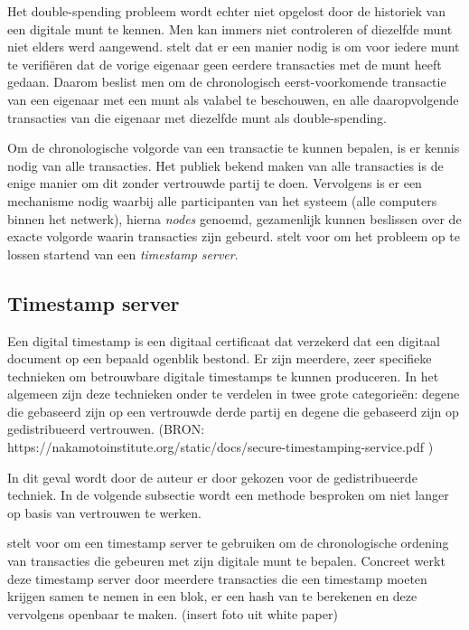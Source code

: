 	Het double-spending probleem wordt echter niet opgelost door de historiek van een digitale munt te kennen. Men kan immers niet controleren of diezelfde munt niet elders werd aangewend. \textcite{Nakamoto2008} stelt dat er een manier nodig is om voor iedere munt te verifiëren dat de vorige eigenaar geen eerdere transacties met de munt heeft gedaan. Daarom beslist men om de chronologisch eerst-voorkomende transactie van een eigenaar met een munt als valabel te beschouwen, en alle daaropvolgende transacties van die eigenaar met diezelfde munt als double-spending. 
			
	Om de chronologische volgorde van een transactie te kunnen bepalen, is er kennis nodig van alle transacties. Het publiek bekend maken van alle transacties is de enige manier om dit zonder vertrouwde partij te doen. Vervolgens is er een mechanisme nodig waarbij alle participanten van het systeem (alle computers binnen het netwerk), hierna \textit{nodes} genoemd, gezamenlijk kunnen beslissen over de exacte volgorde waarin transacties zijn gebeurd. \textcite{Nakamoto2008} stelt voor om het probleem op te lossen startend van een \textit{timestamp server}. 
			
	\subsection{Timestamp server}
	Een digital timestamp is een digitaal certificaat dat verzekerd dat een digitaal document op een bepaald ogenblik bestond. Er zijn meerdere, zeer specifieke technieken om betrouwbare digitale timestamps te kunnen produceren. In het algemeen zijn deze technieken onder te verdelen in twee grote categorieën: degene die gebaseerd zijn op een vertrouwde derde partij en degene die gebaseerd zijn op gedistribueerd vertrouwen. (BRON: https://nakamotoinstitute.org/static/docs/secure-timestamping-service.pdf )
	
	In dit geval wordt door de auteur er door \textcite{Nakamoto2008} gekozen voor de gedistribueerde techniek. In de volgende subsectie wordt een methode besproken om niet langer op basis van vertrouwen te werken.
	
	\textcite{Nakamoto2008} stelt voor om een timestamp server te gebruiken om de chronologische ordening van transacties die gebeuren met zijn digitale munt te bepalen.  Concreet werkt deze timestamp server door meerdere transacties die een timestamp moeten krijgen samen te nemen in een blok, er een hash van te berekenen en deze vervolgens openbaar te maken. (insert foto uit white paper)
	
